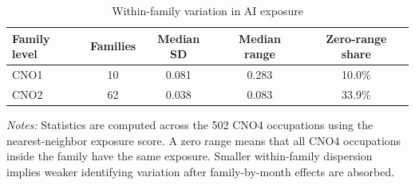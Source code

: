 \begin{table}[!htbp]
\centering
\caption{Within-family variation in AI exposure}
\label{tab:v1_family_support}
\begin{threeparttable}
\begin{tabular}{lcccc}
\toprule
Family level & Families & Median SD & Median range & Zero-range share \\
\midrule
CNO1 & 10 & 0.081 & 0.283 & 10.0\% \\
CNO2 & 62 & 0.038 & 0.083 & 33.9\% \\
\bottomrule
\end{tabular}
\begin{tablenotes}[flushleft]
\footnotesize
\item \emph{Notes:} Statistics are computed across the 502 CNO4 occupations using the nearest-neighbor exposure score. A zero range means that all CNO4 occupations inside the family have the same exposure. Smaller within-family dispersion implies weaker identifying variation after family-by-month effects are absorbed.
\end{tablenotes}
\end{threeparttable}
\end{table}
